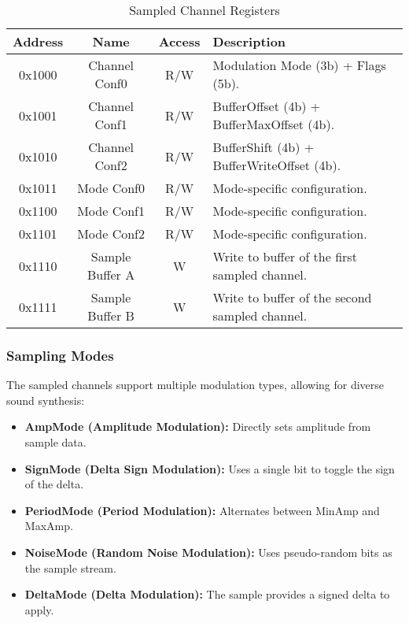 \begin{table}[H]
    \centering
    \begin{tabular}{|c|c|c|l|}
        \hline
        \textbf{Address} & \textbf{Name}        & \textbf{Access} & \textbf{Description} \\
        \hline
        0x1000 & Channel Conf0   & R/W   & Modulation Mode (3b) + Flags (5b). \\
        0x1001 & Channel Conf1   & R/W   & BufferOffset (4b) + BufferMaxOffset (4b). \\
        0x1010 & Channel Conf2   & R/W   & BufferShift (4b) + BufferWriteOffset (4b). \\
        0x1011 & Mode Conf0      & R/W   & Mode-specific configuration. \\
        0x1100 & Mode Conf1      & R/W   & Mode-specific configuration. \\
        0x1101 & Mode Conf2      & R/W   & Mode-specific configuration. \\
        0x1110 & Sample Buffer A & W     & Write to buffer of the first sampled channel. \\
        0x1111 & Sample Buffer B & W     & Write to buffer of the second sampled channel. \\
        \hline
    \end{tabular}
    \caption{Sampled Channel Registers}
\end{table}

\subsubsection{Sampling Modes}
The sampled channels support multiple modulation types, allowing for diverse sound synthesis:
\begin{itemize}
    \item \textbf{AmpMode (Amplitude Modulation):} Directly sets amplitude from sample data.
    \item \textbf{SignMode (Delta Sign Modulation):} Uses a single bit to toggle the sign of the delta.
    \item \textbf{PeriodMode (Period Modulation):} Alternates between MinAmp and MaxAmp.
    \item \textbf{NoiseMode (Random Noise Modulation):} Uses pseudo-random bits as the sample stream.
    \item \textbf{DeltaMode (Delta Modulation):} The sample provides a signed delta to apply.
\end{itemize}

